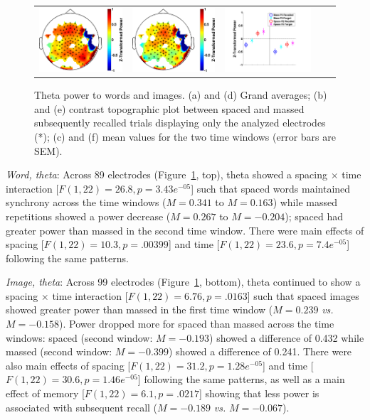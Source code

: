 \begin{figure}[H]
\begin{tabular}{ccccc}
  \includegraphics[width=.19\textwidth]{./figs/exp1/tfr_topocont_ga_img_RgH_rc_spac_p2vsimg_RgH_rc_mass_p2_99ROIs_4_8_0_500_-1p0_1p0_cb} &
  \includegraphics[width=.19\textwidth]{./figs/exp1/tfr_topocont_ga_img_RgH_rc_spac_p2vsimg_RgH_rc_mass_p2_99ROIs_4_8_520_1000_-1p0_1p0_cb} &
  \includegraphics[width=.30\textwidth]{./figs/exp1/tfr_avg_ga_img_RgH_rc_mass_p2_img_RgH_fo_mass_p2_img_RgH_rc_spac_p2_img_RgH_fo_spac_p2_99ROI_0_500_500_1000_4_8_ylabel} \\
  \end{tabular}
  \caption{Theta power to words and images.  (a) and (d) Grand averages; (b) and (e) contrast topographic plot between spaced and massed subsequently recalled trials displaying only the analyzed electrodes (*); (c) and (f) mean values for the two time windows (error bars are SEM).}
  \label{fig:word_img_theta}
\end{figure}

\textit{Word, theta}: Across 89 electrodes (Figure~\ref{fig:word_img_theta}, top), theta showed a spacing $\times$ time interaction [$F(1,22)=26.8, p=3.43e^{-05}$] such that spaced words maintained synchrony across the time windows ($M=0.341$ to $M=0.163$) while massed repetitions showed a power decrease ($M=0.267$ to $M=-0.204$); spaced had greater power than massed in the second time window.
There were main effects of spacing [$F(1,22)=10.3, p=.00399$] and time [$F(1,22)=23.6, p=7.4e^{-05}$] following the same patterns.

\textit{Image, theta}: Across 99 electrodes (Figure~\ref{fig:word_img_theta}, bottom), theta continued to show a spacing $\times$ time interaction [$F(1,22)=6.76, p=.0163$] such that spaced images showed greater power than massed in the first time window ($M=0.239$ \textit{vs.} $M=-0.158$).  Power dropped more for spaced than massed across the time windows: spaced (second window: $M=-0.193$) showed a difference of 0.432 while massed (second window: $M=-0.399$) showed a difference of 0.241.
There were also main effects of spacing [$F(1,22)=31.2, p=1.28e^{-05}$] and time [$F(1,22)=30.6, p=1.46e^{-05}$] following the same patterns, as well as a main effect of memory [$F(1,22)=6.1, p=.0217$] showing that less power is associated with subsequent recall ($M=-0.189$ \textit{vs.} $M=-0.067$).

